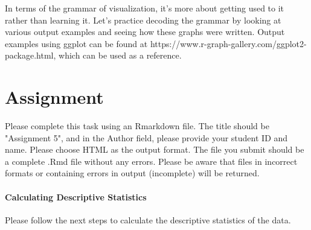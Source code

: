 \documentclass{ltjsbook}
\begin{document}
In terms of the grammar of visualization, it's more about getting used to it rather than learning it. Let's practice decoding the grammar by looking at various output examples and seeing how these graphs were written. Output examples using ggplot can be found at https://www.r-graph-gallery.com/ggplot2-package.html, which can be used as a reference.

\section{Assignment}
Please complete this task using an Rmarkdown file. The title should be "Assignment 5", and in the Author field, please provide your student ID and name. Please choose HTML as the output format. The file you submit should be a complete .Rmd file without any errors. Please be aware that files in incorrect formats or containing errors in output (incomplete) will be returned.
\paragraph{Calculating Descriptive Statistics} Please follow the next steps to calculate the descriptive statistics of the data.







\end{document}

